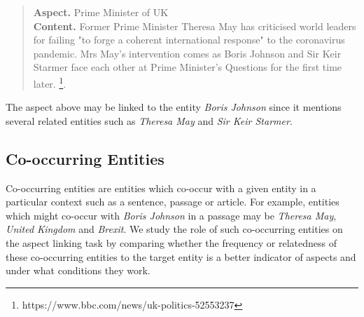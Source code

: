 \begin{quote}
    \textbf{Aspect.} Prime Minister of UK \\
    \textbf{Content.}
    Former Prime Minister Theresa May has criticised world leaders for failing "to forge a coherent international response" to the coronavirus pandemic. Mrs May's intervention comes as Boris Johnson and Sir Keir Starmer face each other at Prime Minister's Questions for the first time later. \footnote{https://www.bbc.com/news/uk-politics-52553237}.
\end{quote}
The aspect above may be linked to the entity \textit{Boris Johnson} since it mentions several related entities such as \textit{Theresa May} and \textit{Sir Keir Starmer}. 

\subsection{Co-occurring Entities}
\label{subsec:Co-occurring Entities}
Co-occurring entities are entities which co-occur with a given entity in a particular context such as a sentence, passage or article. For example, entities which might co-occur with \textit{Boris Johnson} in a passage may be \textit{Theresa May}, \textit{United Kingdom} and \textit{Brexit}. We study the role of such co-occurring entities on the aspect linking task by comparing whether the frequency or relatedness of these co-occurring entities to the target entity is a better indicator of aspects and under what conditions they work. 
